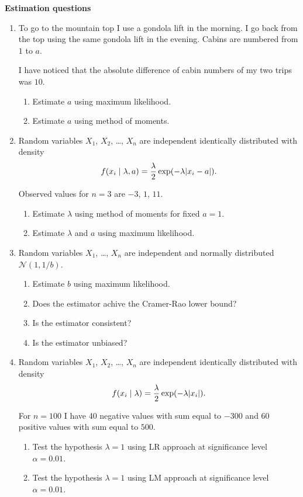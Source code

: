 \documentclass[12pt]{article}
\newcommand{\cN}{\mathcal{N}}
\begin{document}
\textbf{Estimation questions}

\begin{enumerate}


    \item To go to the mountain top I use a gondola lift in the morning. 
    I go back from the top using the same gondola lift in the evening. 
    Cabins are numbered from $1$ to $a$. 

    I have noticed that the absolute difference of cabin numbers of my two trips was $10$. 

    \begin{enumerate}
        \item Estimate $a$ using maximum likelihood. 
        \item Estimate $a$ using method of moments. 
    \end{enumerate}

    \item Random variables $X_1$, $X_2$, \ldots,  $X_n$ are independent identically distributed with density 
    \[
    f(x_i \mid \lambda, a) = \frac{\lambda}{2} \exp(-\lambda \abs{x_i - a}).    
    \]

    Observed values for $n=3$ are $-3$, $1$, $11$.

    \begin{enumerate}
        \item Estimate $\lambda$ using method of moments for fixed $a = 1$. 
        \item Estimate $\lambda$ and $a$ using maximum likelihood.
    \end{enumerate}

    \item Random variables $X_1$, \ldots, $X_n$ are independent and normally distributed $\cN(1, 1/b)$. 
    
    \begin{enumerate}
        \item Estimate $b$ using maximum likelihood.
        \item Does the estimator achive the Cramer-Rao lower bound?
        \item Is the estimator consistent?
        \item Is the estimator unbiased?
    \end{enumerate}

    \item Random variables $X_1$, $X_2$, \ldots,  $X_n$ are independent identically distributed with density 
    \[
    f(x_i \mid \lambda) = \frac{\lambda}{2} \exp(-\lambda \abs{x_i}).    
    \]

    For $n=100$ I have 40 negative values with sum equal to $-300$ and 60 positive values with sum equal to $500$. 

    \begin{enumerate}
        \item Test the hypothesis $\lambda = 1$ using LR approach at significance level $\alpha=0.01$.
        \item Test the hypothesis $\lambda = 1$ using LM approach at significance level $\alpha=0.01$.
    \end{enumerate}


\end{enumerate}
\end{document}
